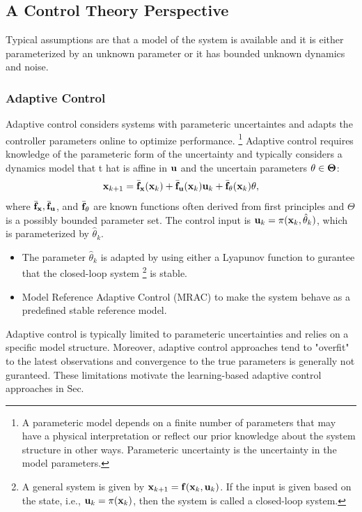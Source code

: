 \documentclass{article}
\begin{document}
\subsection{A Control Theory Perspective}

Typical assumptions are that a model of the system is available and it is either parameterized by an unknown parameter or it has bounded unknown dynamics and noise.

\subsubsection{Adaptive Control}

Adaptive control considers systems with parameteric uncertaintes and adapts the controller parameters online to optimize performance.
\footnote{
    A parameteric model depends on a finite number of parameters that may have a physical interpretation or reflect our prior knowledge about the system structure in other ways. 
    Parameteric uncertainty is the uncertainty in the model parameters.
}
Adaptive control requires knowledge of the parameteric form of the uncertainty and typically considers a dynamics model that t  hat is affine in $\mathbf{u}$ and the uncertain parameters $\mathbf{\theta \in \Theta}$:
\begin{equation}
    \mathbf{x}_{k + 1} = \bar{\mathbf{f}}_{\mathbf{x}}(\mathbf{x}_k) + \bar{\mathbf{f}}_{\mathbf{u}}(\mathbf{x}_k) \mathbf{u}_k + \bar{\mathbf{f}}_\theta(\mathbf{x}_k) \theta,
\end{equation}
where $\bar{\mathbf{f}}_{\mathbf{x}}, \bar{\mathbf{f}}_{\mathbf{u}}$, and $\bar{\mathbf{f}}_\theta$ are known functions often derived from first principles and $\Theta$ is a possibly bounded parameter set.
The control input is $\mathbf{u}_k = \pi(\mathbf{x}_k, \hat{\theta}_k)$, which is parameterized by $\hat{\theta}_k$.
\begin{itemize}
    \item The parameter $\hat{\theta}_k$ is adapted by using either a Lyapunov function to gurantee that the closed-loop system \footnote{A general system is given by $\mathbf{x}_{k + 1} = \mathbf{f}(\mathbf{x}_k, \mathbf{u}_k)$. If the input is given based on the state, i.e., $\mathbf{u}_k = \pi(\mathbf{x}_k)$, then the system is called a closed-loop system.} is stable.
    \item Model Reference Adaptive Control (MRAC) to make the system behave as a predefined stable reference model.
\end{itemize}
Adaptive control is typically limited to parameteric uncertainties and relies on a specific model structure.
Moreover, adaptive control approaches tend to "overfit" to the latest observations and convergence to the true parameters is generally not guranteed.
These limitations motivate the learning-based adaptive control approaches in Sec. %
\end{document}
